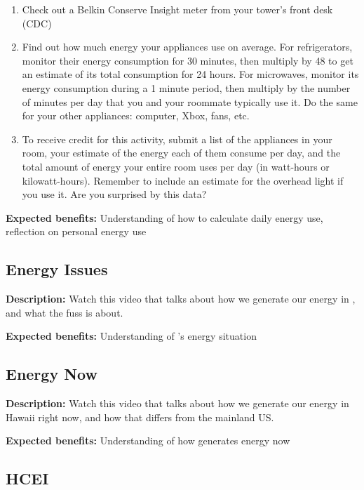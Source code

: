 \begin{enumerate}
	\item Check out a Belkin Conserve Insight meter from your tower's front desk (CDC)
	\item Find out how much energy your appliances use on average. For refrigerators, monitor their energy consumption for 30 minutes, then multiply by 48 to get an estimate of its total consumption for 24 hours. For microwaves, monitor its energy consumption during a 1 minute period, then multiply by the number of minutes per day that you and your roommate typically use it. Do the same for your other appliances: computer, Xbox, fans, etc.
	\item To receive credit for this activity, submit a list of the appliances in your room, your estimate of the energy each of them consume per day, and the total amount of energy your entire room uses per day (in watt-hours or kilowatt-hours). Remember to include an estimate for the overhead light if you use it. Are you surprised by this data?
\end{enumerate}

\vspace{2ex}
\textbf{Expected benefits:} Understanding of how to calculate daily energy use, reflection on personal energy use


\subsection{Energy Issues}

\textbf{Description:} Watch this video that talks about how we generate our energy in \Hawaii, and what the fuss is about.

\vspace{2ex}
\textbf{Expected benefits:} Understanding of \Hawaii's energy situation


\subsection{Energy Now}

\textbf{Description:} Watch this video that talks about how we generate our energy in Hawaii right now, and how that differs from the mainland US.

\vspace{2ex}
\textbf{Expected benefits:} Understanding of how \Hawaii generates energy now


\subsection{HCEI}

